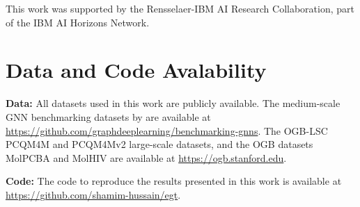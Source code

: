 \documentclass[sigconf,authorversion]{acmart}
\begin{document}
\begin{acks}
This work was supported by the Rensselaer-IBM AI Research Collaboration, part of the IBM AI Horizons Network.
\end{acks}
  




\appendix


\section{Data and Code Avalability}
\textbf{Data:} All datasets used in this work are publicly available. The medium-scale GNN benchmarking datasets by \citet{dwivedi2020benchmarking} are available at \url{https://github.com/graphdeeplearning/benchmarking-gnns}. The OGB-LSC \cite{hu2020open} PCQM4M and PCQM4Mv2 large-scale datasets, and the OGB datasets \citep{hu2021ogb} MolPCBA and MolHIV are available at \url{https://ogb.stanford.edu}.

\noindent\textbf{Code:} The code to reproduce the results presented in this work is available at \url{https://github.com/shamim-hussain/egt}.
\end{document}
